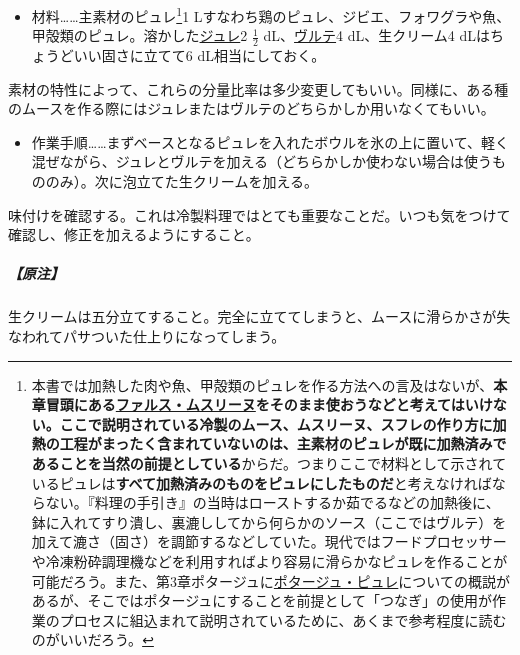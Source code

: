 \begin{recette}
\begin{itemize}
\tightlist
\item
  材料\ldots{}\ldots{}主素材のピュレ\footnote{本書では加熱した肉や魚、甲殻類のピュレを作る方法への言及はないが、\textbf{本章冒頭にある\protect\hyperlink{farce-mousseline}{ファルス・ムスリーヌ}をそのまま使おうなどと考えてはいけない。ここで説明されている冷製のムース、ムスリーヌ、スフレの作り方に加熱の工程がまったく含まれていないのは、主素材のピュレが既に加熱済みであることを当然の前提としている}からだ。つまりここで材料として示されているピュレは\textbf{すべて加熱済みのものをピュレにしたものだ}と考えなければならない。『料理の手引き』の当時はローストするか茹でるなどの加熱後に、鉢に入れてすり潰し、裏漉ししてから何らかのソース（ここではヴルテ）を加えて漉さ（固さ）を調節するなどしていた。現代ではフードプロセッサーや冷凍粉砕調理機などを利用すればより容易に滑らかなピュレを作ることが可能だろう。また、第3章ポタージュに\protect\hyperlink{les-purees}{ポタージュ・ピュレ}についての概説があるが、そこではポタージュにすることを前提として「つなぎ」の使用が作業のプロセスに組込まれて説明されているために、あくまで参考程度に読むのがいいだろう。}1
  Lすなわち鶏のピュレ、ジビエ、フォワグラや魚、甲殻類のピュレ。溶かした\protect\hyperlink{gelees-ordinaires}{ジュレ}2
  \(\frac{1}{2}\) dL、\protect\hyperlink{veloute}{ヴルテ}4
  dL、生クリーム4 dLはちょうどいい固さに立てて6 dL相当にしておく。
\end{itemize}

素材の特性によって、これらの分量比率は多少変更してもいい。同様に、ある種のムースを作る際にはジュレまたはヴルテのどちらかしか用いなくてもいい。

\begin{itemize}
\tightlist
\item
  作業手順\ldots{}\ldots{}まずベースとなるピュレを入れたボウルを氷の上に置いて、軽く混ぜながら、ジュレとヴルテを加える（どちらかしか使わない場合は使うもののみ）。次に泡立てた生クリームを加える。
\end{itemize}

味付けを確認する。これは冷製料理ではとても重要なことだ。いつも気をつけて確認し、修正を加えるようにすること。

\hypertarget{nota-composition-de-l-appareil-pour-mousses-et-mousseline-froides}{%
\subparagraph{【原注】}\label{nota-composition-de-l-appareil-pour-mousses-et-mousseline-froides}}

生クリームは五分立てすること。完全に立ててしまうと、ムースに滑らかさが失なわれてパサついた仕上りになってしまう。


\end{recette}
